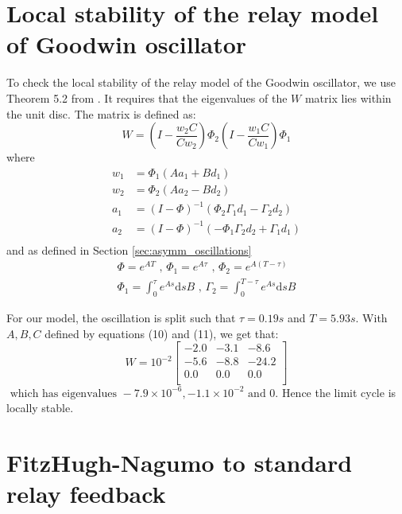 \documentclass[a4paper, 12pt]{article}
\begin{document}
\newpage
\begin{appendices}
\appendixpage
{}
\renewcommand{\thefigure}{A\arabic{figure}}
\setcounter{figure}{0}
\label{Appendix}
\section{Local stability of the relay model of Goodwin oscillator}
To check the local stability of the relay model of the Goodwin oscillator, we use Theorem 5.2 from \cite{astrom1995}. It requires that the eigenvalues of the $W$ matrix lies within the unit disc. The matrix is defined as:
\begin{equation}
W = \left(I - \frac{w_2C}{Cw_2}\right)\Phi_2\left(I - \frac{w_1C}{Cw_1}\right)\Phi_1
\end{equation}
where
\begin{align}
w_1 &= \Phi_1(Aa_1+Bd_1) \\
w_2 &= \Phi_2(Aa_2-Bd_2) \\
a_1 &= (I-\Phi)^{-1}(\Phi_2\Gamma_1d_1-\Gamma_2d_2)\\
a_2 &= (I-\Phi)^{-1}(-\Phi_1\Gamma_2d_2+\Gamma_1d_1)\\
\end{align}
and as defined in Section \ref{sec:asymm_oscillations}
\begin{equation}
\begin{array}{l}
\displaystyle \Phi = e^{AT}  \text{  ,  }\Phi_1 = e^{A\tau} \text{  ,  }  \Phi_2 = e^{A(T-\tau)} \\
\displaystyle \Phi_1 = \int_0^\tau e^{As}\text{d}sB \text{  ,  } \Gamma_2 = \int_0^{T-\tau}e^{As}\text{d}sB
\end{array}
\end{equation}

For our model, the oscillation is split such that $\tau = 0.19s $ and $T = 5.93s$. With $A,B,C$ defined by equations (10) and (11), we get that:
\begin{equation}
W = 10^{-2}\begin{bmatrix}
-2.0 & -3.1 & -8.6 \\ -5.6 & -8.8& -24.2 \\ 0.0 & 0.0 & 0.0 \\
\end{bmatrix}
\end{equation}
$\text{  which has eigenvalues } -7.9\times10^{-6}, -1.1\times10^{-2} \text{ and } 0. $
Hence the limit cycle is locally stable. 
\newpage
\section{FitzHugh-Nagumo to standard relay feedback}\vspace{-.8cm}


\end{appendices}
\end{document}
